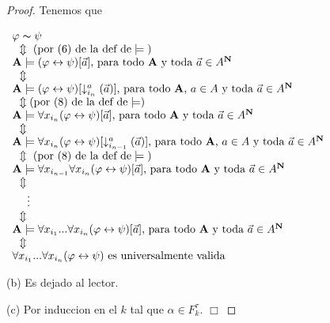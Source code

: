  \begin{proof}
    Tenemos que

    \(\displaystyle \begin{array}{l} \varphi \thicksim \psi \\ \ \ \Updownarrow \text{ (por (6) de la def de}\models \text{)} \\ \mathbf{A}\models (\varphi \leftrightarrow \psi )[\vec{a}]\text{, para todo } \mathbf{A}\text{ y toda }\vec{a}\in A^{\mathbf{N}} \\ \ \ \Updownarrow \\ \mathbf{A}\models (\varphi \leftrightarrow \psi )[\downarrow _{i_{n}}^{a}(\vec{a })]\text{, para todo }\mathbf{A}\text{, }a\in A\text{ y toda }\vec{a}\in A^{ \mathbf{N}} \\ \ \ \Updownarrow (\text{por (8) de la def de}\models ) \\ \mathbf{A}\models \forall x_{i_{n}}(\varphi \leftrightarrow \psi )[\vec{a}] \text{, para todo }\mathbf{A}\text{ y toda }\vec{a}\in A^{\mathbf{N}} \\ \ \ \Updownarrow \\ \mathbf{A}\models \forall x_{i_{n}}(\varphi \leftrightarrow \psi )[\downarrow _{i_{n-1}}^{a}(\vec{a})]\text{, para todo }\mathbf{A}\text{, }a\in A\text{ y toda }\vec{a}\in A^{\mathbf{N}} \\ \ \ \Updownarrow \text{ (por (8) de la def de}\models \text{)} \\ \mathbf{A}\models \forall x_{i_{n-1}}\forall x_{i_{n}}(\varphi \leftrightarrow \psi )[\vec{a}]\text{, para todo }\mathbf{A}\text{ y toda }\vec{a}\in A^{ \mathbf{N}} \\ \ \ \Updownarrow \\ \ \ \ \ \vdots \\ \ \ \Updownarrow \\ \mathbf{A}\models \forall x_{i_{1}}...\forall x_{i_{n}}(\varphi \leftrightarrow \psi )[\vec{a}]\text{, para todo }\mathbf{A}\text{ y toda }\vec{a}\in A^{ \mathbf{N}} \\ \ \ \Updownarrow \\ \forall x_{i_{1}}...\forall x_{i_{n}}(\varphi \leftrightarrow \psi )\text{ es universalmente valida} \end{array} \)

    (b) Es dejado al lector.

    (c) Por induccion en el \(k\) tal que \(\alpha \in F_{k}^{\tau }\). \(\Box\)
  \end{proof}

